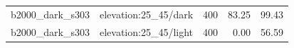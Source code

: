 \begin{longtable}{l>{\raggedright\arraybackslash}p{.42\linewidth}rrr}
b2000\_\allowbreak{}dark\_\allowbreak{}s303 & %
elevation:25\_\allowbreak{}45/dark & %
400 & %
83.25 & %
99.43 \\ %

b2000\_\allowbreak{}dark\_\allowbreak{}s303 & %
elevation:25\_\allowbreak{}45/light & %
400 & %
0.00 & %
56.59 \\ %


\end{longtable}
